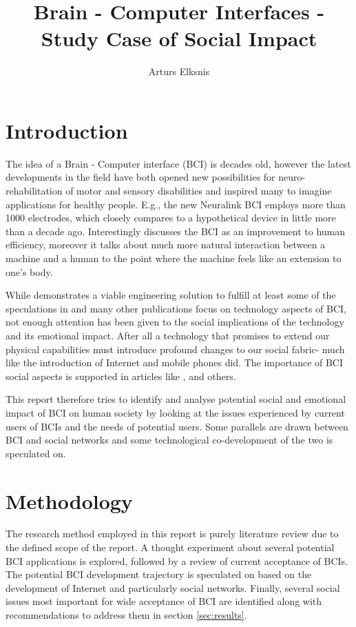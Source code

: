 \documentclass[fleqn,11pt]{olplainarticle}
\title{Brain - Computer Interfaces - Study Case of Social Impact}
\author[1]{Arturs Elksnis}
\begin{document}
\flushbottom
\maketitle
\thispagestyle{empty}

\section{Introduction}
The idea of a Brain - Computer interface (BCI) is decades old, however the latest developments in the field have both opened new possibilities for neuro-rehabilitation of motor and sensory disabilities and inspired many to imagine applications for healthy people. E.g., the new Neuralink BCI \cite{musk2019integrated} employs more than 1000 electrodes, which closely compares to a hypothetical device in \cite{schalk2008brain} little more than a decade ago. Interestingly \cite{schalk2008brain} discusses the BCI as an improvement to human efficiency, moreover it talks about much more natural interaction between a machine and a human to the point where the machine feels like an extension to one's body.

While \cite{musk2019integrated} demonstrates a viable engineering solution to fulfill at least some of the speculations in \cite{schalk2008brain} and many other publications focus on technology aspects of BCI, not enough attention has been given to the social implications of the technology and its emotional impact. After all a technology that promises to extend our physical capabilities must introduce profound changes to our social fabric- much like the introduction of Internet and mobile phones did. The importance of BCI social aspects is supported in articles like \cite{sexton2015overlooked}, \cite{kogel2019using} and others.

This report therefore tries to identify and analyse potential social and emotional impact of BCI on human society by looking at the issues experienced by current users of BCIs and the needs of potential users. Some parallels are drawn between BCI and social networks and some technological co-development of the two is speculated on.

\section{Methodology}
The research method employed in this report is purely literature review due to the defined scope of the report. A thought experiment about several potential BCI applications is explored, followed by a review of current acceptance of BCIs. The potential BCI development trajectory is speculated on based on the development of Internet and particularly social networks. Finally, several social issues most important for wide acceptance of BCI are identified along with recommendations to address them in section \ref{sec:results}.
\end{document}
